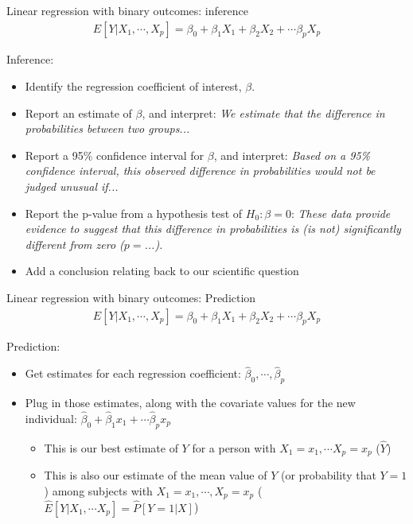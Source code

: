 \documentclass[10pt,t]{beamer}
\begin{document}
\begin{frame}{Linear regression with binary outcomes: inference}
	\vspace{-1.5cm}
	\begin{align*} 
		E[Y|X_1,\cdots,X_p] = \beta_0 + \beta_1 X_1 + \beta_2 X_2 + \cdots \beta_p X_p 
	\end{align*}
	
	\vspace{-0.2cm}
	\color{blue} Inference:  \color{black}
	\begin{itemize}
		\item Identify the regression coefficient of interest, $\beta$. \pause %
		\item Report an estimate of $\beta$, and interpret: \textit{We estimate that the difference in probabilities between two groups...} \pause
		\item Report a 95\% confidence interval for $\beta$, and interpret: \textit{Based on a 95\% confidence interval, this observed difference in probabilities would not be judged unusual if...} \pause
		\item Report the p-value from a hypothesis test of $H_0: \beta = 0$: \textit{These data provide evidence to suggest that this difference in probabilities is (is not) significantly different from zero ($p =$...).} \pause
		\item Add a conclusion relating back to our scientific question
	\end{itemize}
\end{frame}

\begin{frame}{Linear regression with binary outcomes: Prediction}
	\begin{align*} 
		E[Y|X_1,\cdots,X_p] = \beta_0 + \beta_1 X_1 + \beta_2 X_2 + \cdots \beta_p X_p 
	\end{align*}
	
	\vspace{-0.2cm}
	\color{blue} Prediction: \color{black}
	\begin{itemize} \itemsep +5pt
		\item Get estimates for each regression coefficient: $\hat\beta_0, \cdots, \hat\beta_p$ \pause
		\item Plug in those estimates, along with the covariate values for the new individual: $\hat\beta_0 + \hat\beta_1 x_1 + \cdots \hat\beta_p x_p$ \pause
		\begin{itemize} \itemsep +5pt
			\item This is our best estimate of $Y$ for a person with $X_1 = x_1, \cdots X_p = x_p$ ($\hat{Y}$) \pause
			\item This is also our estimate of the mean value of $Y$ (or probability that $Y=1$) among subjects with $X_1 = x_1, \cdots, X_p = x_p$ ($\hat{E}[Y|X_1,\cdots X_p] = \hat{P}[Y=1|X]$)
		\end{itemize}
	\end{itemize}
	
\end{frame}
\end{document}

